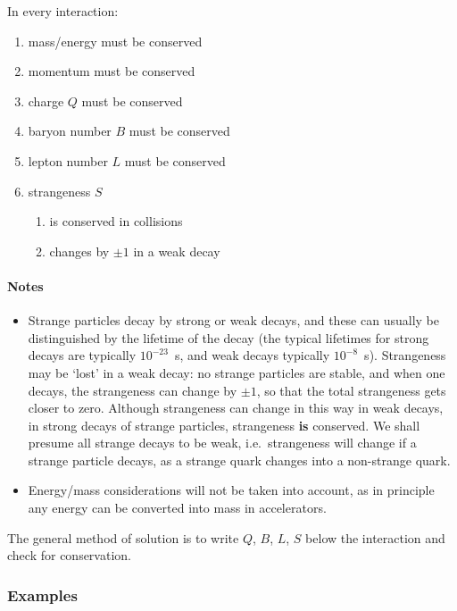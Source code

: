 In every interaction:
\begin{enumerate}
\item mass/energy must be conserved
\item momentum must be conserved
\item charge $Q$ must be conserved
\item baryon  number $B$ must be conserved
\item lepton number $L$ must be conserved
\item strangeness $S$ \begin{enumerate}\item is conserved in collisions
\item changes by $\pm 1$ in a weak decay\end{enumerate}
\end{enumerate}

\paragraph{Notes}
\begin{itemize}
\item Strange particles decay by strong or weak decays, and these can usually be distinguished by the lifetime of the decay (the typical lifetimes for strong decays are typically $10^{-23}$~s, and weak decays typically $10^{-8}$~s).  Strangeness may be `lost' in a weak decay: no strange particles are stable, and when one decays, the strangeness can change by $\pm 1$, so that the total strangeness gets closer to zero.  Although strangeness can change in this way in weak decays, in strong decays of strange particles, strangeness {\bf is} conserved. We shall presume all strange decays to be weak, i.e.\ strangeness will change if a strange particle decays, as a strange quark changes into a non-strange quark.
\item Energy/mass considerations will not be taken into account, as in principle any energy can be converted into mass in accelerators.
\end{itemize}

The general method of solution is to write $Q$, $B$, $L$, $S$ below the interaction and check for conservation.

\subsubsection{Examples}

